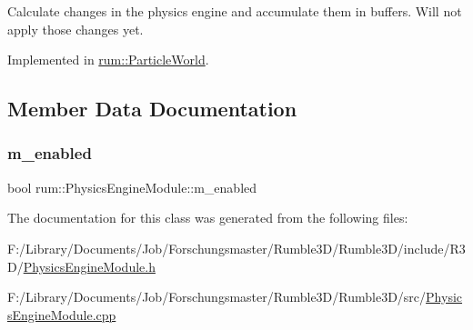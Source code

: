 Calculate changes in the physics engine and accumulate them in buffers. Will not apply those changes yet. 

Implemented in \hyperlink{classrum_1_1_particle_world_a3d71b71a6a76744b75990e1c53efd92e}{rum\+::\+Particle\+World}.



\subsection{Member Data Documentation}
\mbox{\label{classrum_1_1_physics_engine_module_acf8ef2890d8aed6c265d28e4e0288e88}} 
\subsubsection{\texorpdfstring{m\+\_\+enabled}{m\_enabled}}
{\footnotesize\ttfamily bool rum\+::\+Physics\+Engine\+Module\+::m\+\_\+enabled\hspace{0.3cm}{\ttfamily [protected]}}



The documentation for this class was generated from the following files\+:\begin{DoxyCompactItemize}
\item 
F\+:/\+Library/\+Documents/\+Job/\+Forschungsmaster/\+Rumble3\+D/\+Rumble3\+D/include/\+R3\+D/\hyperlink{_physics_engine_module_8h}{Physics\+Engine\+Module.\+h}\item 
F\+:/\+Library/\+Documents/\+Job/\+Forschungsmaster/\+Rumble3\+D/\+Rumble3\+D/src/\hyperlink{_physics_engine_module_8cpp}{Physics\+Engine\+Module.\+cpp}\end{DoxyCompactItemize}
